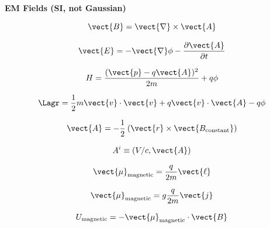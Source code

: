 {\bf EM Fields (SI, not Gaussian)}

\begin{equation}
\vect{B} = \vect{\nabla} \times \vect{A}
\end{equation}

\begin{equation}
\vect{E} = -\vect{\nabla} \phi - \frac{\partial \vect{A}}{\partial t}
\end{equation}

\begin{equation}
H = \frac{(\vect{p} - q \vect{A})^2}{2m} + q \phi
\end{equation}

\begin{equation}
\Lagr = \frac{1}{2} m \vect{v} \cdot \vect{v} + q \vect{v} \cdot \vect{A} - q \phi
\end{equation}

\begin{equation}
\vect{A} = - \frac{1}{2} \: (\vect{r} \times \vect{B_{\rm constant}})
\end{equation}

\begin{equation}
A^{i} \equiv (V/c,\vect{A})
\end{equation}

\begin{equation}
\vect{\mu}_{\rm magnetic} = \frac{q}{2m} \vect{\ell}
\end{equation}

\begin{equation}
\vect{\mu}_{\rm magnetic} = g \frac{q}{2m} \vect{j}
\end{equation}

\begin{equation}
U_{\rm magnetic} = - \vect{\mu}_{\rm magnetic} \cdot \vect{B}
\end{equation}

